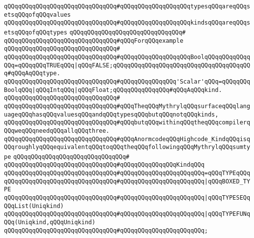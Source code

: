 \verb|qQQqqQQqqQQqqQQqqQQqqQQqqQQqqQQq#qQQqqQQqqQQqqQQqqQQqtypesqQQqareqQQqsetsqQQqofqQQqvalues|\newline
\verb|qQQqqQQqqQQqqQQqqQQqqQQqqQQqqQQq#qQQqqQQqqQQqqQQqqQQqkindsqQQqareqQQqsetsqQQqofqQQqtypes|\newline
\verb|qQQqqQQqqQQqqQQqqQQqqQQqqQQqqQQq#|\newline
\verb|qQQqqQQqqQQqqQQqqQQqqQQqqQQqqQQq#qQQqForqQQqexample|\newline
\verb|qQQqqQQqqQQqqQQqqQQqqQQqqQQqqQQq#|\newline
\verb|qQQqqQQqqQQqqQQqqQQqqQQqqQQqqQQq#qQQqqQQqqQQqqQQqqQQqBoolqQQqqQQqqQQqqQQq=qQQqqQQqTRUEqQQq|\verb#|qQQqFALSE;qQQqqQQqqQQqqQQqqQQqqQQqqQQqqQQqqQQqqQQq#\verb|#qQQqAqQQqtype.|\newline
\verb|qQQqqQQqqQQqqQQqqQQqqQQqqQQqqQQq#qQQqqQQqqQQqqQQq'Scalar'qQQq=qQQqqQQqBoolqQQq|\verb#|qQQqIntqQQq|qQQqFloat;qQQqqQQqqQQqqQQq#\verb|#qQQqAqQQqkind.|\newline
\verb|qQQqqQQqqQQqqQQqqQQqqQQqqQQqqQQq#|\newline
\verb|qQQqqQQqqQQqqQQqqQQqqQQqqQQqqQQq#qQQqTheqQQqMythrylqQQqsurfaceqQQqlanguageqQQqhasqQQqvaluesqQQqandqQQqtypesqQQqbutqQQqnotqQQqkinds,|\newline
\verb|qQQqqQQqqQQqqQQqqQQqqQQqqQQqqQQq#qQQqbutqQQqwithinqQQqtheqQQqcompilerqQQqweqQQqneedqQQqallqQQqthree.|\newline
\newline
\newline
\verb|qQQqqQQqqQQqqQQqqQQqqQQqqQQqqQQq#qQQqAnormcodeqQQqHighcode_KindqQQqisqQQqroughlyqQQqequivalentqQQqtoqQQqtheqQQqfollowingqQQqMythrylqQQqsumtype|\newline
\verb|qQQqqQQqqQQqqQQqqQQqqQQqqQQqqQQq#|\newline
\verb|qQQqqQQqqQQqqQQqqQQqqQQqqQQqqQQq#qQQqqQQqqQQqqQQqKindqQQq|\newline
\verb|qQQqqQQqqQQqqQQqqQQqqQQqqQQqqQQq#qQQqqQQqqQQqqQQqqQQqqQQq=qQQqTYPEqQQq|\newline
\verb|qQQqqQQqqQQqqQQqqQQqqQQqqQQqqQQq#qQQqqQQqqQQqqQQqqQQqqQQq|\verb#|qQQqBOXED_TYPE#\newline
\verb|qQQqqQQqqQQqqQQqqQQqqQQqqQQqqQQq#qQQqqQQqqQQqqQQqqQQqqQQq|\verb#|qQQqTYPESEQqQQqList(Uniqkind)#\newline
\verb|qQQqqQQqqQQqqQQqqQQqqQQqqQQqqQQq#qQQqqQQqqQQqqQQqqQQqqQQq|\verb#|qQQqTYPEFUNqQQq(Uniqkind,qQQqUniqkind)#\newline
\verb|qQQqqQQqqQQqqQQqqQQqqQQqqQQqqQQq#qQQqqQQqqQQqqQQqqQQqqQQq;|\newline
